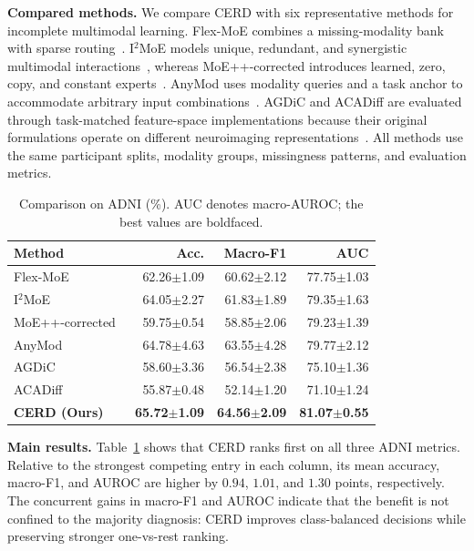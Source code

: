 \documentclass[a4paper,fleqn]{cas-dc}
\begin{document}
\noindent\textbf{Compared methods.}
We compare CERD with six representative methods for incomplete multimodal learning. Flex-MoE combines a missing-modality bank with sparse routing~\cite{ref_flexmoe}. I$^2$MoE models unique, redundant, and synergistic multimodal interactions~\cite{xin2025i2moe}, whereas MoE++-corrected introduces learned, zero, copy, and constant experts~\cite{jin2025moepp}. AnyMod uses modality queries and a task anchor to accommodate arbitrary input combinations~\cite{feng2024anymod}. AGDiC and ACADiff are evaluated through task-matched feature-space implementations because their original formulations operate on different neuroimaging representations~\cite{li2025agdic,zhou2026acadiff}. All methods use the same participant splits, modality groups, missingness patterns, and evaluation metrics.

\begin{table}[t]
\centering
\caption{Comparison on ADNI (\%). AUC denotes macro-AUROC; the best values are boldfaced.}
\label{tab:adni_results}
\setlength{\tabcolsep}{3pt}
\renewcommand{\arraystretch}{1.08}
\small
\begin{tabular*}{\columnwidth}{@{\extracolsep{\fill}}lrrr@{}}
\toprule
\textbf{Method} & \textbf{Acc.} & \textbf{Macro-F1} & \textbf{AUC} \\
\midrule
Flex-MoE~\cite{ref_flexmoe}
& 62.26$\pm$1.09 & 60.62$\pm$2.12 & 77.75$\pm$1.03 \\
I$^2$MoE~\cite{xin2025i2moe}
& 64.05$\pm$2.27 & 61.83$\pm$1.89 & 79.35$\pm$1.63 \\
MoE++-corrected~\cite{jin2025moepp}
& 59.75$\pm$0.54 & 58.85$\pm$2.06 & 79.23$\pm$1.39 \\
AnyMod~\cite{feng2024anymod}
& 64.78$\pm$4.63 & 63.55$\pm$4.28 & 79.77$\pm$2.12 \\
AGDiC~\cite{li2025agdic}
& 58.60$\pm$3.36 & 56.54$\pm$2.38 & 75.10$\pm$1.36 \\
ACADiff~\cite{zhou2026acadiff}
& 55.87$\pm$0.48 & 52.14$\pm$1.20 & 71.10$\pm$1.24 \\
\textbf{CERD (Ours)}
& \textbf{65.72$\pm$1.09} & \textbf{64.56$\pm$2.09} & \textbf{81.07$\pm$0.55} \\
\bottomrule
\end{tabular*}
\end{table}

\noindent\textbf{Main results.}
Table~\ref{tab:adni_results} shows that CERD ranks first on all three ADNI metrics. Relative to the strongest competing entry in each column, its mean accuracy, macro-F1, and AUROC are higher by \(0.94\), \(1.01\), and \(1.30\) points, respectively. The concurrent gains in macro-F1 and AUROC indicate that the benefit is not confined to the majority diagnosis: CERD improves class-balanced decisions while preserving stronger one-vs-rest ranking.
\end{document}
